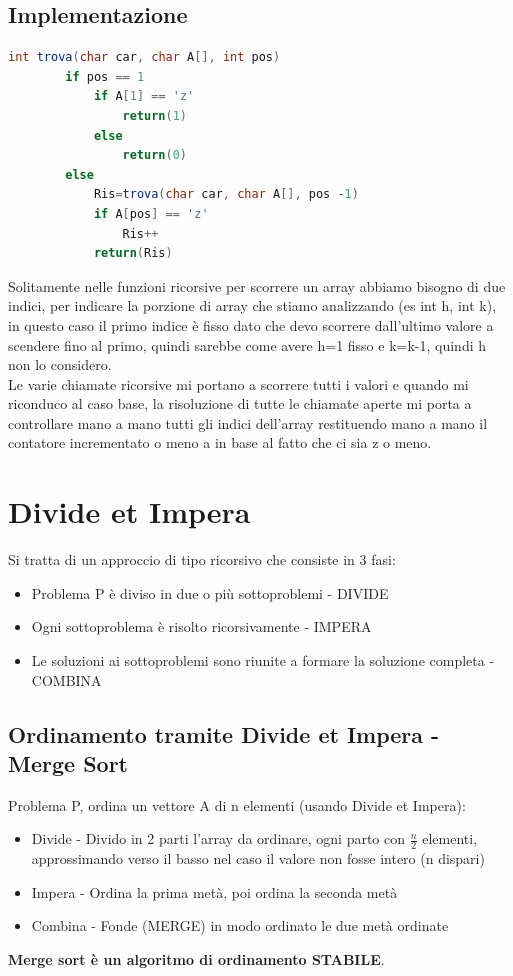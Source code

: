 \subsection{Implementazione}
\begin{lstlisting}[language=Java]
    int trova(char car, char A[], int pos)
        if pos == 1
            if A[1] == 'z'
                return(1)
            else
                return(0)
        else
            Ris=trova(char car, char A[], pos -1)
            if A[pos] == 'z'
                Ris++
            return(Ris)
\end{lstlisting}
Solitamente nelle funzioni ricorsive per scorrere un array abbiamo bisogno di due indici,
per indicare la porzione di array che stiamo analizzando (es int h, int k), in questo
caso il primo indice è fisso dato che devo scorrere dall'ultimo valore a scendere fino al primo, quindi
sarebbe come avere h=1 fisso e k=k-1, quindi h non lo considero.\\
Le varie chiamate ricorsive mi portano a scorrere tutti i valori e quando mi riconduco al caso base, 
la risoluzione di tutte le chiamate aperte mi porta a controllare mano a mano tutti gli indici dell'array
restituendo mano a mano il contatore incrementato o meno a in base al fatto che ci sia z o meno.

\section{Divide et Impera}
Si tratta di un approccio di tipo ricorsivo che consiste in 3 fasi:
\begin{itemize}
    \item Problema P è diviso in due o più sottoproblemi - DIVIDE
    \item Ogni sottoproblema è risolto ricorsivamente - IMPERA
    \item Le soluzioni ai sottoproblemi sono riunite a formare la soluzione completa - COMBINA
\end{itemize}
\subsection{Ordinamento tramite Divide et Impera - Merge Sort}
Problema P, ordina un vettore A di n elementi (usando Divide et Impera):
\begin{itemize}
    \item Divide - Divido in 2 parti l'array da ordinare, ogni parto con $\frac{n}{2}$
    elementi, approssimando verso il basso nel caso il valore non fosse intero (n dispari)
    \item Impera - Ordina la prima metà, poi ordina la seconda metà
    \item Combina - Fonde (MERGE) in modo ordinato le due metà ordinate
\end{itemize}
\textbf{Merge sort è un algoritmo di ordinamento STABILE}.
